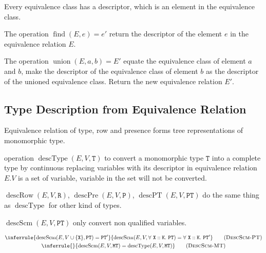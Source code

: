 \documentclass{report}
\newcommand{\code}{\mathtt}
\newcommand{\ruleTag}[1]{\label{#1}\tag{\textsc{#1}}}
\DeclareMathOperator{\union}{union}
\DeclareMathOperator{\find}{find}
\DeclareMathOperator{\describeScheme}{descScm}
\DeclareMathOperator{\describeType}{descType}
\DeclareMathOperator{\describeRow}{descRow}
\DeclareMathOperator{\describePresence}{descPre}
\DeclareMathOperator{\describePresenceWithType}{descPT}
\begin{document}
Every equivalence class has a descriptor, which is an element in the equivalence class.

The operation \(\find(E, e) = e'\) return the descriptor of the element \(e\) in the equivalence relation \(E\).

The operation \(\union(E, a, b) = E'\) equate the equivalence class of element \(a\) and \(b\), make the descriptor of the equivalence class of element \(b\) as the descriptor of the unioned equivalence class. Return the new equivalence relation \(E'\).

\subsection{Type Description from Equivalence Relation}

Equivalence relation of type, row and presence forms tree representations of monomorphic type.

operation \(\describeType(E, V, \code{T})\) to convert a monomorphic type \(\code{T}\) into a complete type by continuous replacing variables with its descriptor in equivalence relation \(E\).\(V\) is a set of variable, variable in the set will not be converted.

\(\describeRow(E, V, \code{R})\), \(\describePresence(E, V, \code{P})\), \(\describePresenceWithType(E, V, \code{PT})\) do the same thing as \(\describeType\) for other kind of types.

\(\describeScheme(E, V, \code{PT})\) only convert non qualified variables.

\begin{gather}
\inferrule
{\describeScheme(E, V \cup \{\code{X}\}, \code{PT}) = \code{PT}'}
{\describeScheme(E, V, \forall\ \code{X} :: \code{K} .\ \code{PT}) = \forall\ \code{X} :: \code{K} .\ \code{PT}'}
\ruleTag{DescScm-PT}
\\
\inferrule
{}
{\describeScheme(E, V, \code{MT}) = \describeType(E, V, \code{MT})}
\ruleTag{DescScm-MT}
\end{gather}
\end{document}
